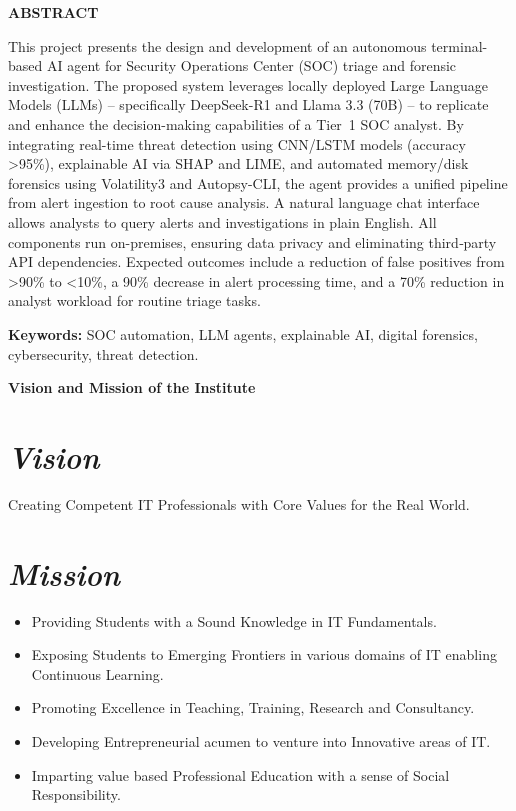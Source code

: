 \documentclass[12pt,a4paper]{report}
\begin{document}
\newpage
\begin{center}
  {\Large\bfseries ABSTRACT}
\end{center}
\vspace{0.5cm}
\thispagestyle{empty}

This project presents the design and development of an autonomous terminal-based AI agent for Security Operations Center (SOC) triage and forensic investigation. The proposed system leverages locally deployed Large Language Models (LLMs) – specifically DeepSeek-R1 and Llama 3.3 (70B) – to replicate and enhance the decision-making capabilities of a Tier~1 SOC analyst. By integrating real-time threat detection using CNN/LSTM models (accuracy >95\%), explainable AI via SHAP and LIME, and automated memory/disk forensics using Volatility3 and Autopsy-CLI, the agent provides a unified pipeline from alert ingestion to root cause analysis. A natural language chat interface allows analysts to query alerts and investigations in plain English. All components run on-premises, ensuring data privacy and eliminating third‑party API dependencies. Expected outcomes include a reduction of false positives from >90\% to <10\%, a 90\% decrease in alert processing time, and a 70\% reduction in analyst workload for routine triage tasks.

\vspace{0.3cm}
\noindent
\textbf{Keywords:} SOC automation, LLM agents, explainable AI, digital forensics, cybersecurity, threat detection.

\newpage
\begin{center}
  {\Large\bfseries Vision and Mission of the Institute}
\end{center}
\vspace{0.5cm}
\thispagestyle{empty}

\section*{\textit{Vision}}
Creating Competent IT Professionals with Core Values for the Real World.

\section*{\textit{Mission}}
\begin{itemize}
  \item Providing Students with a Sound Knowledge in IT Fundamentals.
  \item Exposing Students to Emerging Frontiers in various domains of IT enabling Continuous Learning.
  \item Promoting Excellence in Teaching, Training, Research and Consultancy.
  \item Developing Entrepreneurial acumen to venture into Innovative areas of IT.
  \item Imparting value based Professional Education with a sense of Social Responsibility.
\end{itemize}
\end{document}

